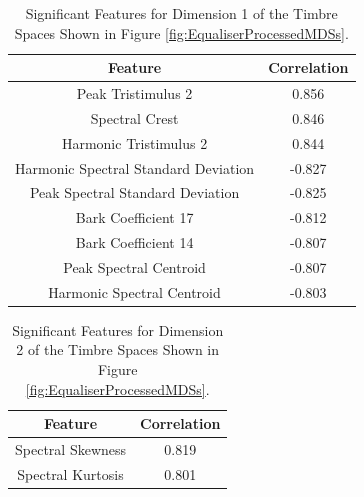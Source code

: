 	\begin{table}[h!]
		\centering
		\begin{tabular}{|c|c|}
			\hline
			\bf{Feature} & \bf{Correlation} \\
			\hline
			\hline
			Peak Tristimulus 2 &  0.856 \\
			\hline
			Spectral Crest &  0.846 \\
			\hline
			Harmonic Tristimulus 2 &  0.844 \\
			\hline
			Harmonic Spectral Standard Deviation & -0.827 \\
			\hline
			Peak Spectral Standard Deviation & -0.825 \\
			\hline
			Bark Coefficient 17 & -0.812 \\
			\hline
			Bark Coefficient 14 & -0.807 \\
			\hline
			Peak Spectral Centroid & -0.807 \\
			\hline
			Harmonic Spectral Centroid & -0.803 \\
			\hline
		\end{tabular}
		\caption{Significant Features for Dimension 1 of the Timbre Spaces Shown in Figure 
			 \ref{fig:EqualiserProcessedMDSs}.}
		\label{tab:EqualiserProcessedFeaturesDim1}
	\end{table}

	\begin{table}[h!]
		\centering
		\begin{tabular}{|c|c|}
			\hline
			\bf{Feature} & \bf{Correlation} \\
			\hline
			\hline
			Spectral Skewness & 0.819 \\
			\hline
			Spectral Kurtosis & 0.801 \\
			\hline
		\end{tabular}
		\caption{Significant Features for Dimension 2 of the Timbre Spaces Shown in Figure 
			 \ref{fig:EqualiserProcessedMDSs}.}
		\label{tab:EqualiserProcessedFeaturesDim2}
	\end{table}

